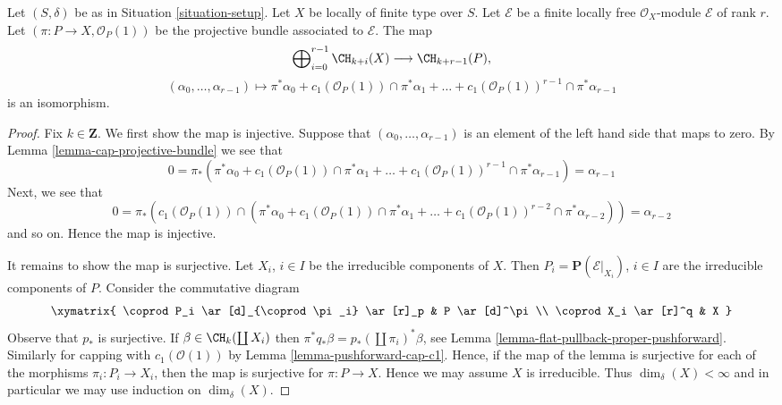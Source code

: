 \begin{lemma}
\label{lemma-chow-ring-projective-bundle}
Let $(S, \delta)$ be as in Situation \ref{situation-setup}.
Let $X$ be locally of finite type over $S$.
Let $\mathcal{E}$ be a finite locally free $\mathcal{O}_X$-module
$\mathcal{E}$ of rank $r$. Let $(\pi : P \to X, \mathcal{O}_P(1))$
be the projective bundle associated to $\mathcal{E}$.
The map
$$
\bigoplus\nolimits_{i = 0}^{r - 1}
\CH_{k + i}(X)
\longrightarrow
\CH_{k + r - 1}(P),
$$
$$
(\alpha_0, \ldots, \alpha_{r-1})
\longmapsto
\pi^*\alpha_0 +
c_1(\mathcal{O}_P(1)) \cap \pi^*\alpha_1
+ \ldots +
c_1(\mathcal{O}_P(1))^{r - 1} \cap \pi^*\alpha_{r-1}
$$
is an isomorphism.
\end{lemma}

\begin{proof}
Fix $k \in \mathbf{Z}$. We first show the map is injective.
Suppose that $(\alpha_0, \ldots, \alpha_{r - 1})$ is an element
of the left hand side that maps to zero.
By Lemma \ref{lemma-cap-projective-bundle} we see that
$$
0 = \pi_*(\pi^*\alpha_0 +
c_1(\mathcal{O}_P(1)) \cap \pi^*\alpha_1
+ \ldots +
c_1(\mathcal{O}_P(1))^{r - 1} \cap \pi^*\alpha_{r-1})
= \alpha_{r - 1}
$$
Next, we see that
$$
0 = \pi_*(c_1(\mathcal{O}_P(1)) \cap (\pi^*\alpha_0 +
c_1(\mathcal{O}_P(1)) \cap \pi^*\alpha_1
+ \ldots +
c_1(\mathcal{O}_P(1))^{r - 2} \cap \pi^*\alpha_{r - 2}))
= \alpha_{r - 2}
$$
and so on. Hence the map is injective.

\medskip\noindent
It remains to show the map is surjective.
Let $X_i$, $i \in I$ be the irreducible components of $X$.
Then $P_i = \mathbf{P}(\mathcal{E}|_{X_i})$, $i \in I$
are the irreducible components of $P$. Consider the commutative
diagram
$$
\xymatrix{
\coprod P_i \ar[d]_{\coprod \pi_i} \ar[r]_p & P \ar[d]^\pi \\
\coprod X_i \ar[r]^q & X
}
$$
Observe that $p_*$ is surjective. If $\beta \in \CH_k(\coprod X_i)$
then $\pi^* q_* \beta = p_*(\coprod \pi_i)^* \beta$, see
Lemma \ref{lemma-flat-pullback-proper-pushforward}. Similarly for
capping with $c_1(\mathcal{O}(1))$ by
Lemma \ref{lemma-pushforward-cap-c1}.
Hence, if the map of the lemma is surjective for each
of the morphisms $\pi_i : P_i \to X_i$, then the map is
surjective for $\pi : P \to X$. Hence we may assume $X$ is irreducible.
Thus $\dim_\delta(X) < \infty$ and in particular we may use
induction on $\dim_\delta(X)$.


\end{proof}
